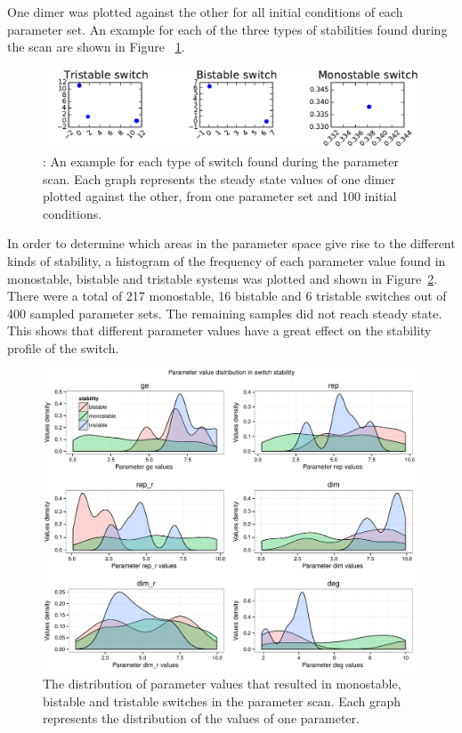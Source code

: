 One dimer was plotted against the other for all initial conditions of each parameter set. An example for each of the three types of stabilities found during the scan are shown in Figure ~\ref{fig:stab exampl}.

\begin{figure}[htbp]
\centering
\includegraphics[width=\textwidth]{../../chapters/chapterABCSysBio/images/switch_stbility_examples}
\caption[LoF caption]{\label{fig:stab exampl}: An example for each type of switch found during the parameter scan. Each graph represents the steady state values of one dimer plotted against the other, from one parameter set and 100 initial conditions.}
\end{figure}



In order to determine which areas in the parameter space give rise to the different kinds of stability, a histogram of the frequency of each parameter value found in monostable, bistable and tristable systems was plotted and shown in Figure~\ref{fig:scan ode param hist}. There were a total of 217 monostable, 16 bistable and 6 tristable switches out of 400 sampled parameter sets. The remaining samples did not reach steady state. This shows that different parameter values have a great effect on the stability profile of the switch.
 
\begin{figure}
\centering
\begin{minipage}[c]{1\textwidth}
\centering
    \includegraphics[width=1.05\textwidth]{../../chapters/chapterABCSysBio/images/param_stability_hist}
    \caption{The distribution of parameter values that resulted in monostable, bistable and tristable switches in the parameter scan. Each graph represents the distribution of the values of one parameter. }
    \label{fig:scan ode param hist}
\end{minipage}
\end{figure}



